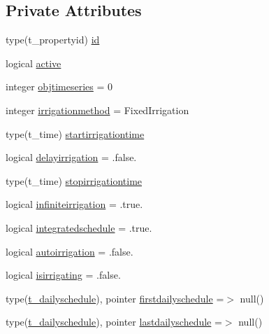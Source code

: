 \subsection*{Private Attributes}
\begin{DoxyCompactItemize}
\item 
type(t\+\_\+propertyid) \mbox{\hyperlink{structmoduleirrigation_1_1t__irrischedule_a6d10576beb12cae3ef4a5c49ca553474}{id}}
\item 
logical \mbox{\hyperlink{structmoduleirrigation_1_1t__irrischedule_ad47e02fe26f917b335c533acaaef8d37}{active}}
\item 
integer \mbox{\hyperlink{structmoduleirrigation_1_1t__irrischedule_a081ba2025be241ecc27103f791301dbe}{objtimeseries}} = 0
\item 
integer \mbox{\hyperlink{structmoduleirrigation_1_1t__irrischedule_a38275b1d32ab43dcb39d2f2493b865b2}{irrigationmethod}} = Fixed\+Irrigation
\item 
type(t\+\_\+time) \mbox{\hyperlink{structmoduleirrigation_1_1t__irrischedule_a3297957da806b7b4bb5f7a8afccda25b}{startirrigationtime}}
\item 
logical \mbox{\hyperlink{structmoduleirrigation_1_1t__irrischedule_a313ead4507fde58b41261ff69987150b}{delayirrigation}} = .false.
\item 
type(t\+\_\+time) \mbox{\hyperlink{structmoduleirrigation_1_1t__irrischedule_a13294a498e8e9be6b26e7954fa1d0390}{stopirrigationtime}}
\item 
logical \mbox{\hyperlink{structmoduleirrigation_1_1t__irrischedule_ad0315c48417068f9fb1018de5e42d854}{infiniteirrigation}} = .true.
\item 
logical \mbox{\hyperlink{structmoduleirrigation_1_1t__irrischedule_a3f626ba8ca56ceface74dd97463d99df}{integratedschedule}} = .true.
\item 
logical \mbox{\hyperlink{structmoduleirrigation_1_1t__irrischedule_a33586be159ce5fcd7ae614bce63d9372}{autoirrigation}} = .false.
\item 
logical \mbox{\hyperlink{structmoduleirrigation_1_1t__irrischedule_ae8a3c8b41e5aee9e3a949f8a48d008cc}{isirrigating}} = .false.
\item 
type(\mbox{\hyperlink{structmoduleirrigation_1_1t__dailyschedule}{t\+\_\+dailyschedule}}), pointer \mbox{\hyperlink{structmoduleirrigation_1_1t__irrischedule_ae860544ddedf56da6c521737bd38758f}{firstdailyschedule}} =$>$ null()
\item 
type(\mbox{\hyperlink{structmoduleirrigation_1_1t__dailyschedule}{t\+\_\+dailyschedule}}), pointer \mbox{\hyperlink{structmoduleirrigation_1_1t__irrischedule_ae01bf2691d011eee8f6d1d313f976341}{lastdailyschedule}} =$>$ null()

\end{DoxyCompactItemize}
